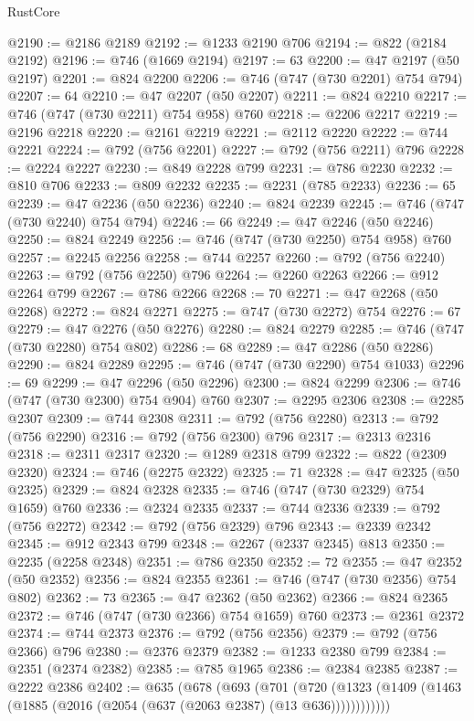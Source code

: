 \begin{lexlean}{RustCore}
\begin{coremodule}
@2190 := @2186 @2189
@2192 := @1233 @2190 @706
@2194 := @822 (@2184 @2192)
@2196 := @746 (@1669 @2194)
@2197 := 63
@2200 := @47 @2197 (@50 @2197)
@2201 := @824 @2200
@2206 := @746 (@747 (@730 @2201) @754 @794)
@2207 := 64
@2210 := @47 @2207 (@50 @2207)
@2211 := @824 @2210
@2217 := @746 (@747 (@730 @2211) @754 @958) @760
@2218 := @2206 @2217
@2219 := @2196 @2218
@2220 := @2161 @2219
@2221 := @2112 @2220
@2222 := @744 @2221
@2224 := @792 (@756 @2201)
@2227 := @792 (@756 @2211) @796
@2228 := @2224 @2227
@2230 := @849 @2228 @799
@2231 := @786 @2230
@2232 := @810 @706
@2233 := @809 @2232
@2235 := @2231 (@785 @2233)
@2236 := 65
@2239 := @47 @2236 (@50 @2236)
@2240 := @824 @2239
@2245 := @746 (@747 (@730 @2240) @754 @794)
@2246 := 66
@2249 := @47 @2246 (@50 @2246)
@2250 := @824 @2249
@2256 := @746 (@747 (@730 @2250) @754 @958) @760
@2257 := @2245 @2256
@2258 := @744 @2257
@2260 := @792 (@756 @2240)
@2263 := @792 (@756 @2250) @796
@2264 := @2260 @2263
@2266 := @912 @2264 @799
@2267 := @786 @2266
@2268 := 70
@2271 := @47 @2268 (@50 @2268)
@2272 := @824 @2271
@2275 := @747 (@730 @2272) @754
@2276 := 67
@2279 := @47 @2276 (@50 @2276)
@2280 := @824 @2279
@2285 := @746 (@747 (@730 @2280) @754 @802)
@2286 := 68
@2289 := @47 @2286 (@50 @2286)
@2290 := @824 @2289
@2295 := @746 (@747 (@730 @2290) @754 @1033)
@2296 := 69
@2299 := @47 @2296 (@50 @2296)
@2300 := @824 @2299
@2306 := @746 (@747 (@730 @2300) @754 @904) @760
@2307 := @2295 @2306
@2308 := @2285 @2307
@2309 := @744 @2308
@2311 := @792 (@756 @2280)
@2313 := @792 (@756 @2290)
@2316 := @792 (@756 @2300) @796
@2317 := @2313 @2316
@2318 := @2311 @2317
@2320 := @1289 @2318 @799
@2322 := @822 (@2309 @2320)
@2324 := @746 (@2275 @2322)
@2325 := 71
@2328 := @47 @2325 (@50 @2325)
@2329 := @824 @2328
@2335 := @746 (@747 (@730 @2329) @754 @1659) @760
@2336 := @2324 @2335
@2337 := @744 @2336
@2339 := @792 (@756 @2272)
@2342 := @792 (@756 @2329) @796
@2343 := @2339 @2342
@2345 := @912 @2343 @799
@2348 := @2267 (@2337 @2345) @813
@2350 := @2235 (@2258 @2348)
@2351 := @786 @2350
@2352 := 72
@2355 := @47 @2352 (@50 @2352)
@2356 := @824 @2355
@2361 := @746 (@747 (@730 @2356) @754 @802)
@2362 := 73
@2365 := @47 @2362 (@50 @2362)
@2366 := @824 @2365
@2372 := @746 (@747 (@730 @2366) @754 @1659) @760
@2373 := @2361 @2372
@2374 := @744 @2373
@2376 := @792 (@756 @2356)
@2379 := @792 (@756 @2366) @796
@2380 := @2376 @2379
@2382 := @1233 @2380 @799
@2384 := @2351 (@2374 @2382)
@2385 := @785 @1965
@2386 := @2384 @2385
@2387 := @2222 @2386
@2402 := @635
    (@678
      (@693
        (@701
          (@720 (@1323 (@1409 (@1463 (@1885 (@2016 (@2054 (@637 (@2063 @2387) (@13 @636))))))))))))

\end{coremodule}
\end{lexlean}
